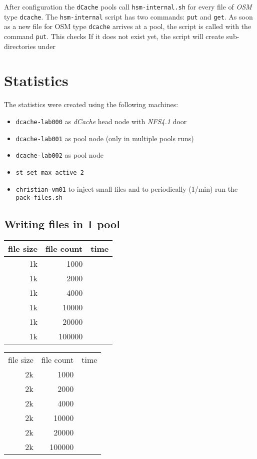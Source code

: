 \documentclass[a4paper,8pt]{scrartcl}
\begin{document}
After configuration the \texttt{dCache} pools call \texttt{hsm-internal.sh} for 
every file of \emph{OSM} type \texttt{dcache}. The \texttt{hsm-internal} script
has two commands: \texttt{put} and \texttt{get}. As soon as a new file for OSM
type \texttt{dcache} arrives at a pool, the script is called with the command 
\texttt{put}. This checks If it does not exist yet, the script will create sub-directories under 

\section{Statistics}
The statistics were created using the following machines:
\begin{itemize}
  \item \texttt{dcache-lab000} as \emph{dCache} head node with \emph{NFS4.1} door
  \item \texttt{dcache-lab001} as pool node (only in multiple pools runs)
  \item \texttt{dcache-lab002} as pool node
  \item \texttt{st set max active 2}
  \item \texttt{christian-vm01} to inject small files and to periodically (1/min) run the \texttt{pack-files.sh}
\end{itemize}

\subsection{Writing files in 1 pool}

\begin{tabular}{|r||r||r|}
  \hline
  file size & file count & time \\
  \hline
  1k & 1000 &  \\
  \hline
  1k & 2000 &  \\
  \hline
  1k & 4000 &\\
  \hline
  1k & 10000 &\\
  \hline
  1k & 20000 &\\
  \hline
  1k & 100000 &\\
  \hline
\end{tabular}

\begin{tabular}{|r||r||r|}
  \hline
  file size & file count & time \\
  2k & 1000 & \\
  \hline
  2k & 2000 &\\
  \hline
  2k & 4000 &\\
  \hline
  2k & 10000 &\\
  \hline
  2k & 20000 &\\
  \hline
  2k & 100000 &\\
  \hline
\end{tabular}
\end{document}
